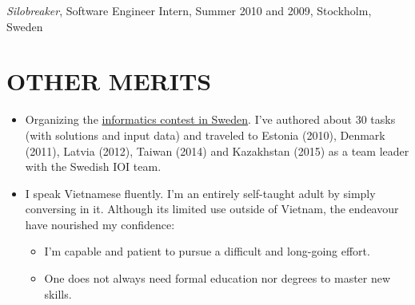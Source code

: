 \documentclass[11pt]{res} %
\begin{document}
\begin{resume}
 \emph{Silobreaker}, {\footnotesize Software Engineer Intern, Summer 2010 and 2009}, Stockholm, Sweden

\section{OTHER MERITS}

\begin{itemize} %
  \item Organizing the \href{http://progolymp.se/}{informatics contest in Sweden}.
    I've authored about
    30 tasks (with solutions and input data) and traveled to Estonia (2010),
    Denmark (2011), Latvia (2012), Taiwan (2014) and Kazakhstan (2015) as a
    team leader with the Swedish IOI team.
  \item I speak Vietnamese fluently. I'm an entirely self-taught adult by simply
    conversing in it.  Although its limited use outside of
    Vietnam,  the endeavour have nourished my confidence:
    \begin{itemize}
        \item I'm capable and patient to pursue a difficult and long-going effort.
        \item One does not always need formal education nor degrees to master new skills.
    \end{itemize}
\end{itemize}

\end{resume}
\end{document}
